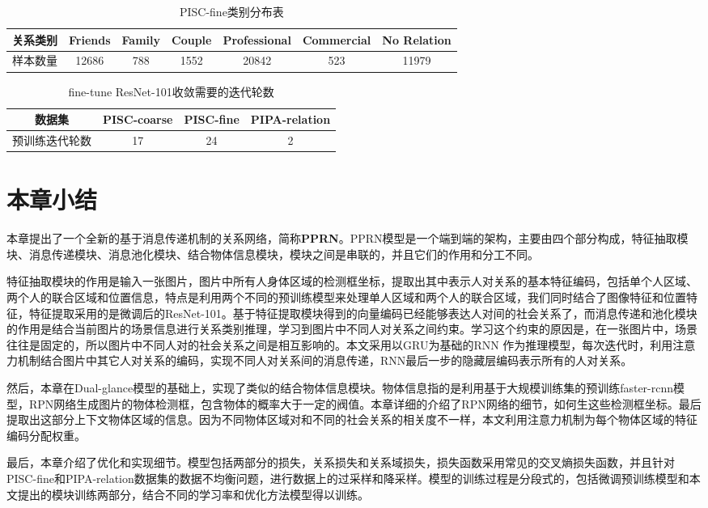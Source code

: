 \begin{table}[htpb]
  \centering
  \caption{PISC-fine类别分布表}
  \label{tab:model-pisc-cls}
  \begin{tabular}{c|c|c|c|c|c|c}
    \toprule
    关系类别 & Friends & Family & Couple & Professional & Commercial & No Relation \\
    \midrule
    样本数量 & 12686 & 788 & 1552 & 20842 & 523 & 11979 \\
    \bottomrule
  \end{tabular}
\end{table}


\begin{table}[htpb]
  \centering
  \caption{fine-tune ResNet-101收敛需要的迭代轮数}
  \label{tab:model-ft-epoch}
  \begin{tabular}{c|c|c|c}
    \toprule
    数据集 & PISC-coarse & PISC-fine  & PIPA-relation \\
    \midrule
    预训练迭代轮数 & 17 & 24 & 2 \\
    \bottomrule
  \end{tabular}
\end{table}

\section{本章小结}

本章提出了一个全新的基于消息传递机制的关系网络，简称\textbf{PPRN}。PPRN模型是一个端到端的架构，主要由四个部分构成，特征抽取模块、消息传递模块、消息池化模块、结合物体信息模块，模块之间是串联的，并且它们的作用和分工不同。

特征抽取模块的作用是输入一张图片，图片中所有人身体区域的检测框坐标，提取出其中表示人对关系的基本特征编码，包括单个人区域、两个人的联合区域和位置信息，特点是利用两个不同的预训练模型来处理单人区域和两个人的联合区域，我们同时结合了图像特征和位置特征，特征提取采用的是微调后的ResNet-101。基于特征提取模块得到的向量编码已经能够表达人对间的社会关系了，而消息传递和池化模块的作用是结合当前图片的场景信息进行关系类别推理，学习到图片中不同人对关系之间约束。学习这个约束的原因是，在一张图片中，场景往往是固定的，所以图片中不同人对的社会关系之间是相互影响的。本文采用以GRU为基础的RNN 作为推理模型，每次迭代时，利用注意力机制结合图片中其它人对关系的编码，实现不同人对关系间的消息传递，RNN最后一步的隐藏层编码表示所有的人对关系。

然后，本章在Dual-glance模型的基础上，实现了类似的结合物体信息模块。物体信息指的是利用基于大规模训练集的预训练faster-rcnn模型，RPN网络生成图片的物体检测框，包含物体的概率大于一定的阀值。本章详细的介绍了RPN网络的细节，如何生这些检测框坐标。最后提取出这部分上下文物体区域的信息。因为不同物体区域对和不同的社会关系的相关度不一样，本文利用注意力机制为每个物体区域的特征编码分配权重。

最后，本章介绍了优化和实现细节。模型包括两部分的损失，关系损失和关系域损失，损失函数采用常见的交叉熵损失函数，并且针对PISC-fine和PIPA-relation数据集的数据不均衡问题，进行数据上的过采样和降采样。模型的训练过程是分段式的，包括微调预训练模型和本文提出的模块训练两部分，结合不同的学习率和优化方法模型得以训练。





